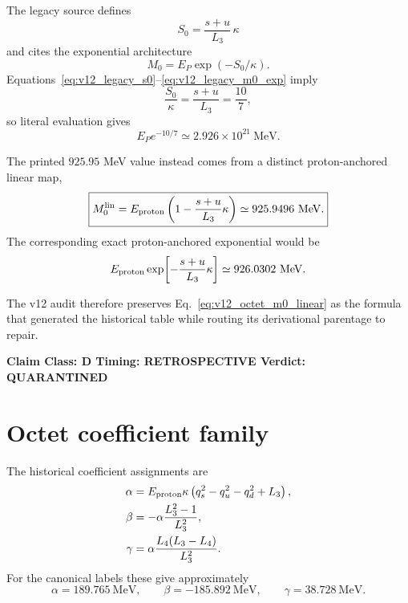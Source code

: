 \documentclass[11pt,a4paper,twoside]{book}
\theoremstyle{definition}
\newcommand{\vTwelveStatus}[3]{\par\noindent\textbf{Claim Class: #1 \quad Timing: #2 \quad Verdict: #3}\par}
\begin{document}
The legacy source defines
\begin{equation}
S_0=\frac{s+u}{L_3}\,\kappa
\label{eq:v12_legacy_s0}
\end{equation}
and cites the exponential architecture
\begin{equation}
M_0=E_P\exp(-S_0/\kappa).
\label{eq:v12_legacy_m0_exp}
\end{equation}
Equations~\eqref{eq:v12_legacy_s0}--\eqref{eq:v12_legacy_m0_exp} imply
\begin{equation}
\frac{S_0}{\kappa}=\frac{s+u}{L_3}=\frac{10}{7},
\end{equation}
so literal evaluation gives
\begin{equation}
E_Pe^{-10/7}\simeq2.926\times10^{21}\ \mathrm{MeV}.
\end{equation}

The printed $925.95$ MeV value instead comes from a distinct proton-anchored linear map,
\begin{equation}
\boxed{
M_0^{\rm lin}
=E_{\rm proton}
\left(1-\frac{s+u}{L_3}\kappa\right)
\simeq925.9496\ \mathrm{MeV}.
}
\label{eq:v12_octet_m0_linear}
\end{equation}
The corresponding exact proton-anchored exponential would be
\begin{equation}
E_{\rm proton}\exp\!\left[-\frac{s+u}{L_3}\kappa\right]
\simeq926.0302\ \mathrm{MeV}.
\end{equation}

The v12 audit therefore preserves Eq.~\eqref{eq:v12_octet_m0_linear} as the formula that generated the historical table while routing its derivational parentage to repair.
\vTwelveStatus{D}{RETROSPECTIVE}{QUARANTINED}

\section{Octet coefficient family}

The historical coefficient assignments are
\begin{align}
\alpha
&=E_{\rm proton}\kappa
\left(q_s^2-q_u^2-q_d^2+L_3\right),
\label{eq:v12_octet_alpha}\\
\beta
&=-\alpha\frac{L_3^2-1}{L_3^2},
\label{eq:v12_octet_beta}\\
\gamma
&=\alpha\frac{L_4(L_3-L_4)}{L_3^2}.
\label{eq:v12_octet_gamma}
\end{align}
For the canonical labels these give approximately
\[
\alpha=189.765\ \mathrm{MeV},\qquad
\beta=-185.892\ \mathrm{MeV},\qquad
\gamma=38.728\ \mathrm{MeV}.
\]
\end{document}
